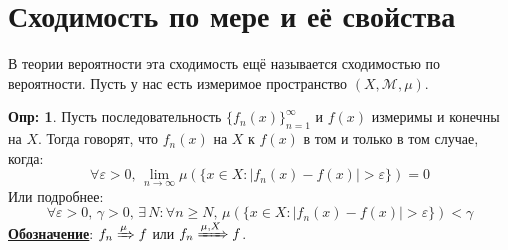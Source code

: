 \documentclass[12pt]{article}
\newcommand{\MM}{\mathcal{M}}
\newcommand{\VE}{\varepsilon}
\theoremstyle{definition}
\newtheorem{defn}{Опр:}
\begin{document}

\section*{Сходимость по мере и её свойства}
В теории вероятности эта  сходимость ещё называется сходимостью по вероятности. Пусть у нас есть измеримое пространство $(X,\MM,\mu)$.

\begin{defn}
	Пусть последовательность $\{f_n(x)\}_{n = 1}^{\infty}$ и $f(x)$ измеримы и конечны на $X$. Тогда говорят, что $f_n(x)$  на $X$ к $f(x)$ в том и только в том случае, когда:
	$$
		\forall \VE > 0, \, \lim\limits_{n \to \infty}\mu(\{x \in X \colon |f_n(x) - f(x)| > \VE\}) = 0
	$$
	Или подробнее:
	$$
		\forall \VE > 0, \, \gamma > 0, \, \exists \, N \colon \forall n \geq N, \, \mu(\{x \in X \colon |f_n(x) - f(x)| > \VE\}) < \gamma
	$$
	\textbf{\uline{Обозначение}}: $f_n \xRightarrow{\mu}f$ или $f_n \xRightarrow{\mu, X} f$.
\end{defn}
\end{document}
